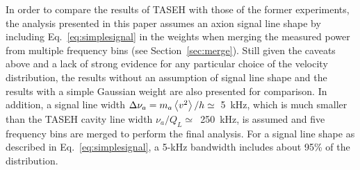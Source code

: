In order to compare the results of TASEH with those of the former experiments, 
the analysis presented in this paper assumes an axion 
signal line shape by including Eq.~\eqref{eq:simplesignal} in the weights 
when merging the measured power from multiple frequency bins 
(see Section~\ref{sec:merge}). Still given the caveats above and a lack of 
strong evidence for any particular choice of the velocity distribution, 
the results without an assumption of signal line shape and the results 
with a simple Gaussian weight are also presented for comparison. 
In addition, a signal line width 
$\Delta\nu_a=m_a\left<v^2\right>/h\simeq$~5~kHz, which is much smaller than 
the TASEH cavity line width $\nu_a/Q_L\simeq$~250~kHz, is assumed and 
five frequency bins are merged to perform the final analysis. For a signal 
line shape as described in Eq.~\eqref{eq:simplesignal}, a 5-kHz bandwidth 
includes about 95\% of the distribution.


 
